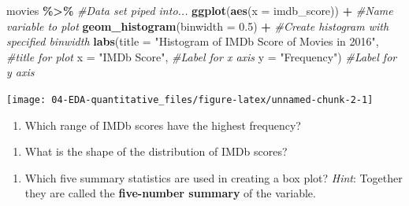 \documentclass[
]{report}
\newenvironment{Shaded}{\begin{snugshade}}{\end{snugshade}}
\newcommand{\CommentTok}[1]{\textcolor[rgb]{0.56,0.35,0.01}{\textit{#1}}}
\newcommand{\DataTypeTok}[1]{\textcolor[rgb]{0.13,0.29,0.53}{#1}}
\newcommand{\FloatTok}[1]{\textcolor[rgb]{0.00,0.00,0.81}{#1}}
\newcommand{\KeywordTok}[1]{\textcolor[rgb]{0.13,0.29,0.53}{\textbf{#1}}}
\newcommand{\NormalTok}[1]{#1}
\newcommand{\OperatorTok}[1]{\textcolor[rgb]{0.81,0.36,0.00}{\textbf{#1}}}
\newcommand{\StringTok}[1]{\textcolor[rgb]{0.31,0.60,0.02}{#1}}
\providecommand{\tightlist}{%
  \setlength{\itemsep}{0pt}\setlength{\parskip}{0pt}}
\begin{document}
\begin{Shaded}
\begin{Highlighting}[]
\NormalTok{movies }\OperatorTok{\%\textgreater{}\%}\StringTok{ }\CommentTok{\#Data set piped into...}
\KeywordTok{ggplot}\NormalTok{(}\KeywordTok{aes}\NormalTok{(}\DataTypeTok{x =}\NormalTok{ imdb\_score)) }\OperatorTok{+}\StringTok{   }\CommentTok{\#Name variable to plot}
\StringTok{  }\KeywordTok{geom\_histogram}\NormalTok{(}\DataTypeTok{binwidth =} \FloatTok{0.5}\NormalTok{) }\OperatorTok{+}\StringTok{  }\CommentTok{\#Create histogram with specified binwidth}
\StringTok{  }\KeywordTok{labs}\NormalTok{(}\DataTypeTok{title =} \StringTok{"Histogram of IMDb Score of Movies in 2016"}\NormalTok{, }\CommentTok{\#title for plot}
       \DataTypeTok{x =} \StringTok{"IMDb Score"}\NormalTok{, }\CommentTok{\#Label for x axis}
       \DataTypeTok{y =} \StringTok{"Frequency"}\NormalTok{) }\CommentTok{\#Label for y axis}
\end{Highlighting}
\end{Shaded}

\begin{center}\texttt{[image: 04-EDA-quantitative\_files/figure-latex/unnamed-chunk-2-1]} \end{center}

\begin{enumerate}
\def\labelenumi{\arabic{enumi}.}
\setcounter{enumi}{7}
\tightlist
\item
  Which range of IMDb scores have the highest frequency?
\end{enumerate}

\vspace{0.4in}

\begin{enumerate}
\def\labelenumi{\arabic{enumi}.}
\setcounter{enumi}{8}
\tightlist
\item
  What is the shape of the distribution of IMDb scores?
\end{enumerate}

\vspace{0.4in}

\begin{enumerate}
\def\labelenumi{\arabic{enumi}.}
\setcounter{enumi}{9}
\tightlist
\item
  Which five summary statistics are used in creating a box plot? \emph{Hint}: Together they are called the \textbf{five-number summary} of the variable.
\end{enumerate}

\vspace{0.4in}
\end{document}
